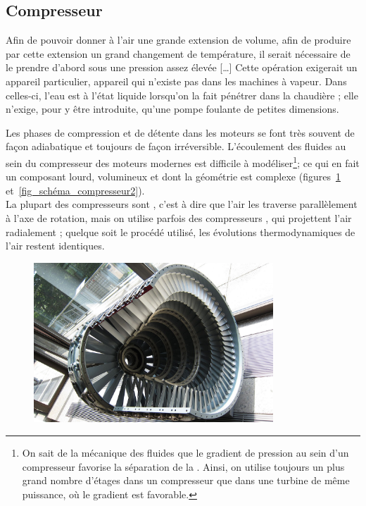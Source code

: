 	\subsection{Compresseur}
	
			Afin de pouvoir donner à l’air une grande extension de volume, afin de produire par cette extension un grand changement de température, il serait nécessaire de le prendre d’abord sous une pression assez élevée […] Cette opération exigerait un appareil particulier, appareil qui n’existe pas dans les machines à vapeur. Dans celles-ci, l’eau est à l’état liquide lorsqu’on la fait pénétrer dans la chaudière ; elle n’exige, pour y être introduite, qu’une pompe foulante de petites dimensions.
	
		Les phases de compression et de détente dans les moteurs se font très souvent de façon adiabatique et toujours de façon irréversible. L’écoulement des fluides au sein du compresseur des moteurs modernes est difficile à modéliser\footnote{On sait de la mécanique des fluides que le gradient de pression au sein d’un compresseur favorise la séparation de la . Ainsi, on utilise toujours un plus grand nombre d’étages dans un compresseur que dans une turbine de même puissance, où le gradient est favorable.}\nolinebreak ; ce qui en fait un composant lourd, volumineux et dont la géométrie est complexe (figures~\ref{fig_schéma_compresseur1} et~\ref{fig_schéma_compresseur2}).\\
		La plupart des compresseurs sont , c’est à dire que l’air les traverse parallèlement à l’axe de rotation, mais on utilise parfois des compresseurs , qui projettent l’air radialement ; quelque soit le procédé utilisé, les évolutions thermodynamiques de l’air restent identiques.

		\begin{figure}
			\begin{center}
				\includegraphics[width=9cm]{images/photo_compresseur.jpg}
			\end{center}
			\label{fig_schéma_compresseur1}
		\end{figure}

